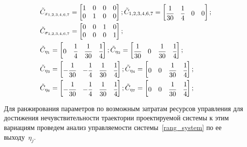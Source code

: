 \begin{align*}
	&\tilde{C}_{x_{1,2,3,4,6,7}} =
	\begin{bmatrix}
		1 & 0 & 0 & 0\\
		0 & 1 & 0 & 0\\
	\end{bmatrix};
	\tilde{C}_{1,2,3,4,6,7} =
	\begin{bmatrix}
		\cfrac{1}{30} & \cfrac{1}{4} & 0 & 0\\
	\end{bmatrix};\\
	&\tilde{C}_{\sigma_{1,2,3,4,6,7}} =
	\begin{bmatrix}
		0 & 0 & 1 & 0\\
		0 & 0 & 0 & 1\\
	\end{bmatrix};\\
	&\tilde{C}_{\eta_1} =
	\begin{bmatrix}
		0 & \cfrac{1}{4} & \cfrac{1}{30} & \cfrac{1}{4}\\
	\end{bmatrix};
	\tilde{C}_{\eta_2} =
	\begin{bmatrix}
		\cfrac{1}{30} & 0 & \cfrac{1}{30} & \cfrac{1}{4}\\
	\end{bmatrix};\\
	&\tilde{C}_{\eta_3} =
	\begin{bmatrix}
		-\cfrac{1}{30} & - \cfrac{1}{4} & \cfrac{1}{30} & \cfrac{1}{4}\\
	\end{bmatrix};
	\tilde{C}_{\eta_4} =
	\begin{bmatrix}
		0 & 0 & \cfrac{1}{30} & \cfrac{1}{4}\\
	\end{bmatrix};\\
	&\tilde{C}_{\eta_6} =
	\begin{bmatrix}
		- \cfrac{1}{30} & - \cfrac{1}{4} & \cfrac{1}{30} & \cfrac{1}{4}\\
	\end{bmatrix};
	\tilde{C}_{\eta_7} =
	\begin{bmatrix}
		0 & 0 & \cfrac{1}{30} & \cfrac{1}{4}\\
	\end{bmatrix};
\end{align*}

Для ранжирования параметров по возможным затратам ресурсов управления для достижения нечувствительности траектории проектируемой системы к этим вариациям проведем анализ
управляемости системы~\ref{rang_system} по ее выходу~$\eta_j$.

